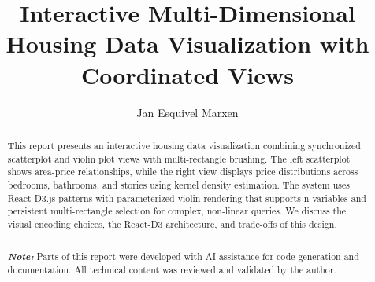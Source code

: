 \documentclass[sigplan,screen]{acmart}
\begin{document}
\title{Interactive Multi-Dimensional Housing Data Visualization with Coordinated Views}


\author{Jan Esquivel Marxen}

\renewcommand{\shortauthors}{Marxen}

\begin{abstract}
  This report presents an interactive housing data visualization
  combining synchronized scatterplot and violin plot views with
  multi-rectangle brushing. The left scatterplot shows area-price
  relationships, while the right view displays price distributions
  across bedrooms, bathrooms, and stories using kernel density
  estimation. The system uses React-D3.js patterns with parameterized
  violin rendering that supports n variables and persistent
  multi-rectangle selection for complex, non-linear queries. We discuss the visual
  encoding choices, the React-D3 architecture, and trade-offs of this design.\\
\smallskip
\noindent\rule{\linewidth}{0.4pt}
\textit{\textbf{Note:}} Parts of this report were developed with AI
assistance for code generation and documentation. All technical content
was reviewed and validated by the author.

\end{abstract}


\maketitle
\end{document}
